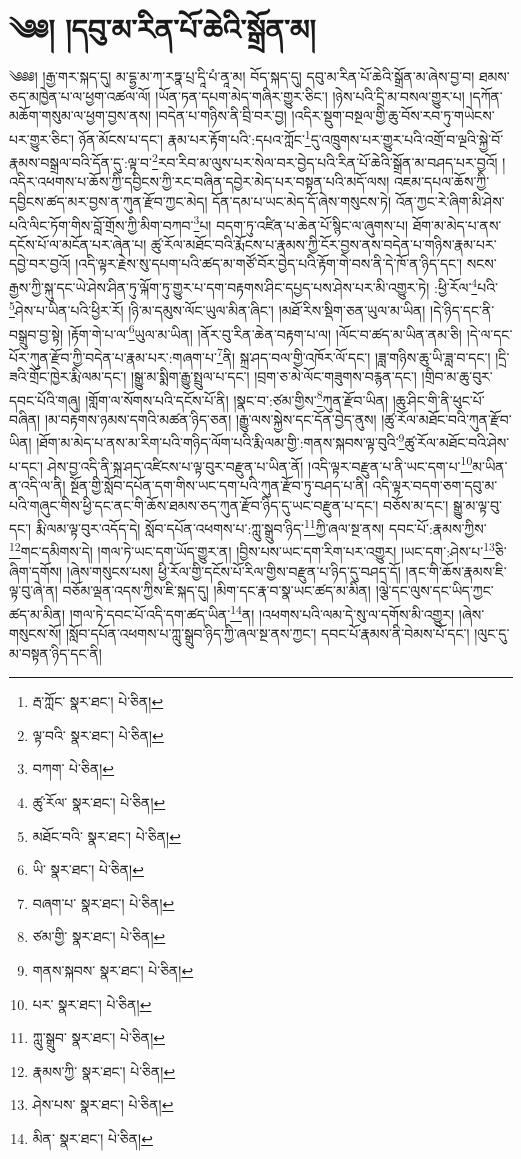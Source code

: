 \setcounter{footnote}{0} 
\chapter{༄༅། །དབུ་མ་རིན་པོ་ཆེའི་སྒྲོན་མ།}༄༅༅། །རྒྱ་གར་སྐད་དུ། མ་དྷྱ་མ་ཀ་རཏྣ་པྲ་དཱི་པཾ་ནཱ་མ། བོད་སྐད་དུ། དབུ་མ་རིན་པོ་ཆེའི་སྒྲོན་མ་ཞེས་བྱ་བ། ཐམས་ཅད་མཁྱེན་པ་ལ་ཕྱག་འཚལ་ལོ། །ཡོན་ཏན་དཔག་མེད་གཞིར་གྱུར་ཅིང་། །ཉེས་པའི་དྲི་མ་བསལ་གྱུར་པ། །དཀོན་མཆོག་གསུམ་ལ་ཕྱག་བྱས་ནས། །བདེན་པ་གཉིས་ནི་བྲི་བར་བྱ། །འདིར་སྡུག་བསྔལ་གྱི་ཆུ་བོས་རབ་ཏུ་གཡེངས་པར་གྱུར་ཅིང་། ཉོན་མོངས་པ་དང་། རྣམ་པར་རྟོག་པའི་:དཔའ་ཀློང་\footnote{རྦ་ཀློང་  སྣར་ཐང་།  པེ་ཅིན། }དུ་འཁྲུགས་པར་གྱུར་པའི་འགྲོ་བ་ལྔའི་སྐྱེ་བོ་རྣམས་བསྒྲལ་བའི་དོན་དུ་:ལྟ་བ་\footnote{ལྟ་བའི་  སྣར་ཐང་།  པེ་ཅིན། }རབ་རིབ་མ་ལུས་པར་སེལ་བར་བྱེད་པའི་རིན་པོ་ཆེའི་སྒྲོན་མ་བཤད་པར་བྱའོ། །འདིར་འཕགས་པ་ཆོས་ཀྱི་དབྱིངས་ཀྱི་རང་བཞིན་དབྱེར་མེད་པར་བསྟན་པའི་མདོ་ལས། འཇམ་དཔལ་ཆོས་ཀྱི་དབྱིངས་ཚད་མར་བྱས་ན་ཀུན་རྫོབ་ཀྱང་མེད། དོན་དམ་པ་ཡང་མེད་དོ་ཞེས་གསུངས་ཏེ། འོན་ཀྱང་རེ་ཞིག་མི་ཤེས་པའི་ལིང་ཏོག་གིས་བློ་གྲོས་ཀྱི་མིག་བཀབ་\footnote{བཀག་  པེ་ཅིན། }པ། བདག་ཏུ་འཛིན་པ་ཆེན་པོ་སྙིང་ལ་ཞུགས་པ། ཐོག་མ་མེད་པ་ནས་དངོས་པོ་ལ་མངོན་པར་ཞེན་པ། ཚུ་རོལ་མཐོང་བའི་རྨོངས་པ་རྣམས་ཀྱི་ངོར་བྱས་ནས་བདེན་པ་གཉིས་རྣམ་པར་དབྱེ་བར་བྱའོ། །འདི་ལྟར་རྗེས་སུ་དཔག་པའི་ཚད་མ་གཙོ་བོར་བྱེད་པའི་རྟོག་གེ་བས་ནི་དེ་ཁོ་ན་ཉིད་དང་། སངས་རྒྱས་ཀྱི་སྐུ་དང་ཡེ་ཤེས་ཤིན་ཏུ་ལྐོག་ཏུ་གྱུར་པ་དག་བརྟགས་ཤིང་དཔྱད་པས་ཤེས་པར་མི་འགྱུར་ཏེ། :ཕྱི་རོལ་\footnote{ཚུ་རོལ་  སྣར་ཐང་།  པེ་ཅིན། }པའི་\footnote{མཐོང་བའི་  སྣར་ཐང་།  པེ་ཅིན། }ཤེས་པ་ཡིན་པའི་ཕྱིར་རོ། །ཉི་མ་དམུས་ལོང་ཡུལ་མིན་ཞིང་། །མཐོ་རིས་སྡིག་ཅན་ཡུལ་མ་ཡིན། །དེ་ཉིད་དང་ནི་བསྒྲུབ་བྱ་སྟེ། །རྟོག་གེ་པ་ལ་\footnote{ཡི་  སྣར་ཐང་།  པེ་ཅིན། }ཡུལ་མ་ཡིན། །ནོར་བུ་རིན་ཆེན་བརྟག་པ་ལ། །ལོང་བ་ཚད་མ་ཡིན་ནམ་ཅི། །དེ་ལ་དང་པོར་ཀུན་རྫོབ་ཀྱི་བདེན་པ་རྣམ་པར་:གཞག་པ་\footnote{བཞག་པ་  སྣར་ཐང་།  པེ་ཅིན། }ནི། སྐྲ་ཤད་བལ་གྱི་འཁོར་ལོ་དང་། །ཟླ་གཉིས་ཆུ་ཡི་ཟླ་བ་དང་། །དྲི་ཟའི་གྲོང་ཁྱེར་རྨི་ལམ་དང་། །སྒྱུ་མ་སྨིག་རྒྱུ་སྤྲུལ་པ་དང་། །བྲག་ཅ་མེ་ལོང་གཟུགས་བརྙན་དང་། །གྲིབ་མ་ཆུ་བུར་དབང་པོའི་གཞུ། །གློག་ལ་སོགས་པའི་དངོས་པོ་ནི། །སྣང་བ་:ཙམ་གྱིས་\footnote{ཙམ་གྱི་  སྣར་ཐང་།  པེ་ཅིན། }ཀུན་རྫོབ་ཡིན། །ཆུ་ཤིང་གི་ནི་ཕུང་པོ་བཞིན། །མ་བརྟགས་ཉམས་དགའི་མཚན་ཉིད་ཅན། །རྒྱུ་ལས་སྐྱེས་དང་དོན་བྱེད་ནུས། །ཚུ་རོལ་མཐོང་བའི་ཀུན་རྫོབ་ཡིན། །ཐོག་མ་མེད་པ་ནས་མ་རིག་པའི་གཉིད་ལོག་པའི་རྨི་ལམ་གྱི་:གནས་སྐབས་ལྟ་བུའི་\footnote{གནས་སྐབས་  སྣར་ཐང་།  པེ་ཅིན། }ཚུ་རོལ་མཐོང་བའི་ཤེས་པ་དང་། ཤེས་བྱ་འདི་ནི་སྐྲ་ཤད་འཛིངས་པ་ལྟ་བུར་བརྫུན་པ་ཡིན་ནོ། །འདི་ལྟར་བརྫུན་པ་ནི་ཡང་དག་པ་\footnote{པར་  སྣར་ཐང་།  པེ་ཅིན། }མ་ཡིན་ན་འདི་ལ་ནི། སྔོན་གྱི་སློབ་དཔོན་དག་གིས་ཡང་དག་པའི་ཀུན་རྫོབ་ཏུ་བཤད་པ་ནི། འདི་ལྟར་བདག་ཅག་དབུ་མ་པའི་གཞུང་གིས་ཕྱི་དང་ནང་གི་ཆོས་ཐམས་ཅད་ཀུན་རྫོབ་ཉིད་དུ་ཡང་བརྫུན་པ་དང་། བཅོས་མ་དང་། སྒྱུ་མ་ལྟ་བུ་དང་། རྨི་ལམ་ལྟ་བུར་འདོད་དེ། སློབ་དཔོན་འཕགས་པ་:ཀླུ་སྒྲུབ་ཉིད་\footnote{ཀླུ་སྒྲུབ་  སྣར་ཐང་།  པེ་ཅིན། }ཀྱི་ཞལ་སྔ་ནས། དབང་པོ་:རྣམས་ཀྱིས་\footnote{རྣམས་ཀྱི་  སྣར་ཐང་།  པེ་ཅིན། }གང་དམིགས་དེ། །གལ་ཏེ་ཡང་དག་ཡོད་གྱུར་ན། །བྱིས་པས་ཡང་དག་རིག་པར་འགྱུར། །ཡང་དག་:ཤེས་པ་\footnote{ཤེས་པས་  སྣར་ཐང་།  པེ་ཅིན། }ཅི་ཞིག་དགོས། །ཞེས་གསུངས་པས། ཕྱི་རོལ་གྱི་དངོས་པོ་རིལ་གྱིས་བརྫུན་པ་ཉིད་དུ་བཤད་དོ། །ནང་གི་ཆོས་རྣམས་ཇི་ལྟ་བུ་ཞེ་ན། བཅོམ་ལྡན་འདས་ཀྱིས་ཇི་སྐད་དུ། །མིག་དང་རྣ་བ་སྣ་ཡང་ཚད་མ་མིན། །ལྕེ་དང་ལུས་དང་ཡིད་ཀྱང་ཚད་མ་མིན། །གལ་ཏེ་དབང་པོ་འདི་དག་ཚད་ཡིན་\footnote{མིན་  སྣར་ཐང་།  པེ་ཅིན། }ན། །འཕགས་པའི་ལམ་དེ་སུ་ལ་དགོས་མི་འགྱུར། །ཞེས་གསུངས་སོ། །སློབ་དཔོན་འཕགས་པ་ཀླུ་སྒྲུབ་ཉིད་ཀྱི་ཞལ་སྔ་ནས་ཀྱང་། དབང་པོ་རྣམས་ནི་བེམས་པོ་དང་། །ལུང་དུ་མ་བསྟན་ཉིད་དང་ནི། 